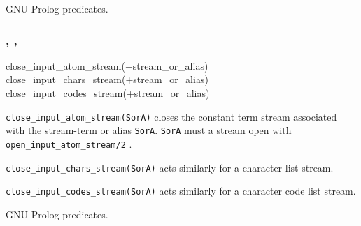 \Portability

GNU Prolog predicates.

\subsubsection{,
               , \\
               }

\begin{TemplatesOneCol}
close\_input\_atom\_stream(+stream\_or\_alias)\\
close\_input\_chars\_stream(+stream\_or\_alias)\\
close\_input\_codes\_stream(+stream\_or\_alias)

\end{TemplatesOneCol}

\Description

\texttt{close\_input\_atom\_stream(SorA)} closes the constant term stream
associated with the stream-term or alias \texttt{SorA}. \texttt{SorA} must a
stream open with \texttt{open\_input\_atom\_stream/2}
.

\texttt{close\_input\_chars\_stream(SorA)} acts similarly for a character
list stream.

\texttt{close\_input\_codes\_stream(SorA)} acts similarly for a character
code list stream.

\begin{PlErrors}






\end{PlErrors}

\Portability

GNU Prolog predicates.

